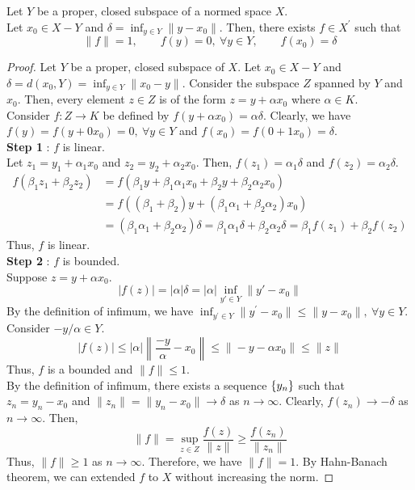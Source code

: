 \begin{lemma}
	Let $Y$ be a proper, closed subspace of a normed space $X$.\\
	Let $x_0 \in X-Y$ and $\displaystyle \delta = \inf_{y \in Y} \| y-x_0\|$.
	Then, there exists $f \in X^\prime$ such that 
	\begin{equation}
		\|f\| = 1,\qquad f(y) = 0,\ \forall y \in Y,\qquad f(x_0) = \delta
	\end{equation}
\end{lemma}
\begin{proof}
	Let $Y$ be a proper, closed subspace of $X$.
	Let $x_0 \in X-Y$ and $\displaystyle \delta = d(x_0,Y) = \inf_{y \in Y} \|x_0-y\|$.
	Consider the subspace $Z$ spanned by $Y$ and $x_0$.
	Then, every element $z \in Z$ is of the form $z = y+\alpha x_0$ where $\alpha \in K$.\\

	Consider $f : Z \to K$ be defined by $f(y+\alpha x_0) = \alpha \delta$.
	Clearly, we have $f(y) = f(y+0x_0) = 0,\ \forall y \in Y$ and $f(x_0) = f(0+1x_0) = \delta$.\\

	\textbf{Step 1} : $f$ is linear.\\
	Let $z_1 = y_1 + \alpha_1 x_0$ and $z_2 = y_2 + \alpha_2 x_0$.
	Then, $f(z_1) = \alpha_1 \delta$ and $f(z_2) = \alpha_2 \delta$.
	\begin{align*}
	f(\beta_1 z_1 + \beta_2 z_2) 
		& = f(\beta_1 y+\beta_1 \alpha_1 x_0 + \beta_2 y + \beta_2 \alpha_2 x_0) \\
		& = f((\beta_1 + \beta_2)y + (\beta_1\alpha_1 + \beta_2\alpha_2)x_0) \\
		& = (\beta_1 \alpha_1 + \beta_2 \alpha_2 ) \delta
		 = \beta_1 \alpha_1 \delta + \beta_2 \alpha_2 \delta 
		 = \beta_1 f(z_1) + \beta_2 f(z_2)
	\end{align*}
	Thus, $f$ is linear.\\

	\textbf{Step 2} : $f$ is bounded.\\
	Suppose $z = y+\alpha x_0$.
	\[ |f(z)| 	
		 = |\alpha| \delta 
		 = |\alpha| \inf_{y' \in Y} \|y'-x_0\|  \]
	By the definition of infimum, we have
	$ \displaystyle \inf_{y^\prime \in Y} \|y^\prime-x_0\| \le \|y-x_0\|,\ \forall y \in Y$.
	Consider $-y/\alpha \in Y$. 
	\[ |f(z)| 	
		 \le |\alpha| \left\|\frac{-y}{\alpha}-x_0 \right\| 
		 \le \|-y - \alpha x_0\| 
		 \le \|z\| \]
	Thus, $f$ is a bounded and $\|f\| \le 1$.\\

	By the definition of infimum, there exists a sequence $\left\{y_n\right\}$ such that \\
	$z_n = y_n - x_0$ and $\|z_n\| = \|y_n - x_0\| \to \delta$ as $n \to \infty$.
	Clearly, $f(z_n) \to -\delta$ as $n \to \infty$.
	Then,
	\[ \|f\| = \sup_{z \in Z} \frac{f(z)}{\|z\|} \ge \frac{f(z_n)}{\|z_n\|} \]
	Thus, $\|f\| \ge 1$ as $n \to \infty$.
	Therefore, we have $\|f\| = 1$.	
	By Hahn-Banach theorem, we can extended $f$ to $X$ without increasing the norm.
\end{proof}


